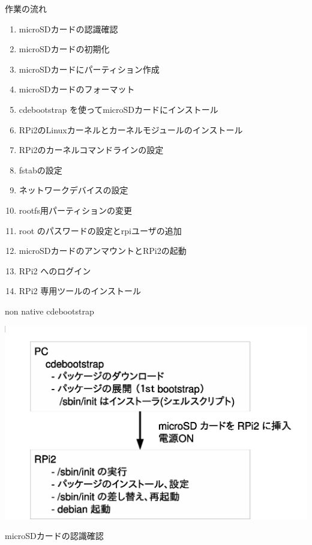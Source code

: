 \begin{frame}{作業の流れ}
\begin{enumerate}
\item microSDカードの認識確認
\item microSDカードの初期化
\item microSDカードにパーティション作成
\item microSDカードのフォーマット
\item cdebootstrap を使ってmicroSDカードにインストール
\item RPi2のLinuxカーネルとカーネルモジュールのインストール
\item RPi2のカーネルコマンドラインの設定
\item fstabの設定
\item ネットワークデバイスの設定
\item rootfs用パーティションの変更
\item root のパスワードの設定とrpiユーザの追加
\item microSDカードのアンマウントとRPi2の起動
\item RPi2 へのログイン
\item RPi2 専用ツールのインストール
\end{enumerate}
\end{frame}

\begin{frame}{non native cdebootstrap}
\begin{center}
\includegraphics[width=0.7\hsize]{image201503/cdebootstrap.eps}
\end{center}
\end{frame}

\begin{frame}[containsverbatim]{microSDカードの認識確認}


\end{frame}

